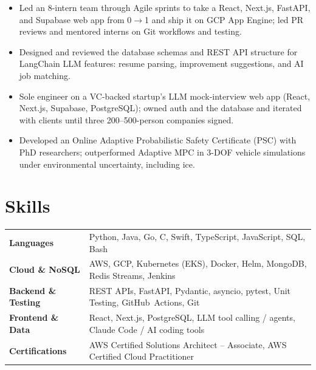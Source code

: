 \documentclass[11pt, letterpaper]{article}
\begin{document}
\begin{itemize}
  \item Led an 8-intern team through Agile sprints to take a React, Next.js, FastAPI, and Supabase web app from 0$\to$1 and ship it on GCP App Engine; led PR reviews and mentored interns on Git workflows and testing.
  \item Designed and reviewed the database schemas and REST API structure for LangChain LLM features: resume parsing, improvement suggestions, and AI job matching.
\end{itemize}

\begin{itemize}
  \item Sole engineer on a VC-backed startup's LLM mock-interview web app (React, Next.js, Supabase, PostgreSQL); owned auth and the database and iterated with clients until three 200--500-person companies signed.
\end{itemize}

\begin{itemize}
  \item Developed an Online Adaptive Probabilistic Safety Certificate (PSC) with PhD researchers; outperformed Adaptive MPC in 3-DOF vehicle simulations under environmental uncertainty, including ice.
\end{itemize}

\section{Skills}
\begin{tabularx}{\textwidth}{@{}l @{\hspace{7pt}} >{\raggedright\arraybackslash}X@{}}
  \textbf{Languages} & Python, Java, Go, C, Swift, TypeScript, JavaScript, SQL, Bash \\[1pt]
  \textbf{Cloud \& NoSQL} & AWS, GCP, Kubernetes (EKS), Docker, Helm, MongoDB, Redis Streams, Jenkins \\[1pt]
  \textbf{Backend \& Testing} & REST APIs, FastAPI, Pydantic, asyncio, pytest, Unit Testing, GitHub~Actions, Git \\[1pt]
  \textbf{Frontend \& Data} & React, Next.js, PostgreSQL, LLM tool calling / agents, Claude Code / AI coding tools \\[1pt]
  \textbf{Certifications} & AWS Certified Solutions Architect -- Associate, AWS Certified Cloud Practitioner \\
\end{tabularx}
\end{document}
